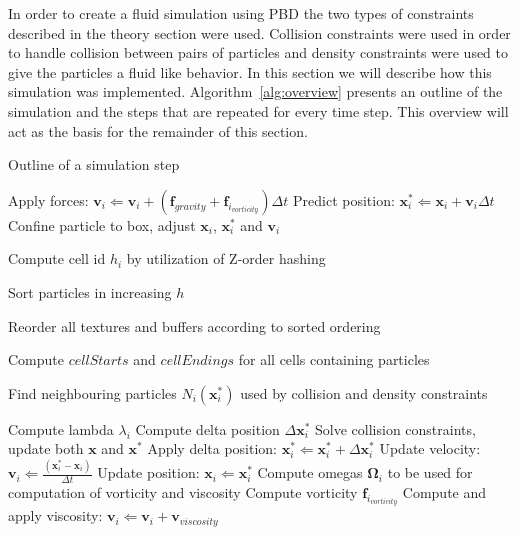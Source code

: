 In order to create a fluid simulation using PBD the two
types of constraints described in the theory section were used. Collision
constraints were used in order to handle collision between pairs of particles
and density constraints were used to give the particles a fluid like behavior.
In this section we will describe how this simulation was implemented.
Algorithm~\ref{alg:overview} presents an outline of the simulation and the steps that are repeated for every time step. This overview will
act as the basis for the remainder of this section.

\begin{algorithm}
\caption{Outline of a simulation step}
\label{alg:overview}
\begin{algorithmic}[1]
\small

\State Apply forces: $\mathbf{v}_{i} \Leftarrow \mathbf{v}_{i} + (\mathbf{f}_{gravity} + \mathbf{f}_{i_{vorticity}})\Delta t$
\State Predict position: $\mathbf{x}_{i}^{*} \Leftarrow \mathbf{x}_{i} + \mathbf{v}_{i} \Delta t$
\State Confine particle to box, adjust $\mathbf{x}_{i}$, $\mathbf{x}_{i}^{*}$ and $\mathbf{v}_{i}$
\EndFor


\State Compute cell id $h_{i}$ by utilization of Z-order hashing
\EndFor

\State Sort particles in increasing $h$

\State Reorder all textures and buffers according to sorted ordering

\State Compute $cellStarts$ and $cellEndings$ for all cells containing particles


\State Find neighbouring particles $N_{i}(\mathbf{x}_{i}^{*})$ used by collision and density constraints
\EndFor

\State Compute lambda $\lambda_{i}$
\EndFor
{}
\State Compute delta position $\Delta \mathbf{x}_{i}^{*}$
\EndFor
{}
\State Solve collision constraints, update both $\mathbf{x}$ and $\mathbf{x}^{*}$
\EndWhile
{}
\State Apply delta position: $\mathbf{x}_{i}^{*} \Leftarrow \mathbf{x}_{i}^{*} + \Delta \mathbf{x}_{i}^{*}$
\EndFor
\EndWhile
{}
\State Update velocity: $\mathbf{v}_{i} \Leftarrow \frac{(\mathbf{x}_{i}^{*} - \mathbf{x}_{i})}{\Delta t}$
\State Update position: $\mathbf{x}_{i} \Leftarrow \mathbf{x}_{i}^{*}$
\EndFor
{}
\State Compute omegas $\mathbf{\Omega}_{i}$ to be used for computation of vorticity and viscosity
\EndFor
{}
\State Compute vorticity $\mathbf{f}_{i_{vorticity}}$
\EndFor
{}
\State Compute and apply viscosity: $\mathbf{v}_{i} \Leftarrow \mathbf{v}_{i} + \mathbf{v}_{viscosity}$
\EndFor

\end{algorithmic}
\end{algorithm}

